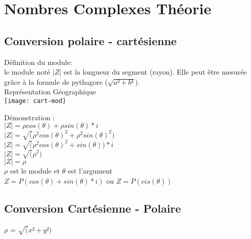 \newpage

\section{Nombres Complexes Théorie}
\vspace{5mm} %

\subsection{Conversion polaire - cartésienne}
\vspace{5mm} %

Définition du module: \\

le module noté $|Z|$ est la longueur du segment (rayon). Elle peut être mesurée  grâce à la formule de pythagore ($\sqrt{a²+b²}$). \\


\vspace{5mm} %
Représentation Géographique \\

\texttt{[image: cart-mod]}
\vspace{2mm} %

Démonstration : \\

$|Z| = \rho cos(\theta)+ \rho sin(\theta) *i$ \\
$|Z| = \sqrt(\rho^{2} cos(\theta)^{2}+ \rho^{2} sin(\theta)^{2})$ \\
$|Z| = \sqrt(\rho^{2} cos(\theta)^{2}+ sin(\theta))*i $ \\
$|Z| = \sqrt(\rho^{2}) $ \\
$|Z| = \rho $ \\

$\rho$ est le module et $\theta$ est l'argument \\
$Z= P(cos(\theta) + sin(\theta)*i )$ ou $Z= P(cis(\theta))$\\

\newpage

\subsection{Conversion Cartésienne - Polaire}
\vspace{5mm} %

$\rho$ = $\sqrt(x²+y²)$ \\

